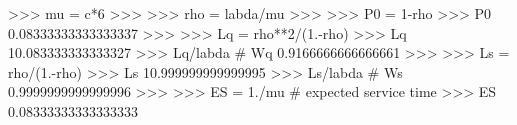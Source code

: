 
>>> mu = c*6
>>>
>>> rho = labda/mu
>>>
>>> P0 = 1-rho
>>> P0
0.08333333333333337
>>>
>>> Lq = rho**2/(1.-rho)
>>> Lq
10.083333333333327
>>> Lq/labda # Wq
0.9166666666666661
>>>
>>> Ls = rho/(1.-rho)
>>> Ls
10.999999999999995
>>> Ls/labda # Ws
0.9999999999999996
>>>
>>> ES = 1./mu # expected service time
>>> ES
0.08333333333333333

